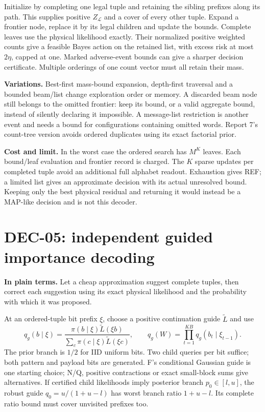 \documentclass[10pt,a4paper]{article}
\begin{document}
Initialize by completing one legal tuple and retaining the sibling prefixes along its path.
This supplies positive $Z_{\mathcal L}$ and a cover of every other tuple.
Expand a frontier node, replace it by its legal children and update the bounds. Complete leaves use
the physical likelihood exactly. Their normalized positive weighted counts give a feasible Bayes action
on the retained list, with excess risk at most $2\eta$, capped at one. Marked adverse-event bounds can
give a sharper decision certificate. Multiple orderings of one count vector must all retain their mass.

\textbf{Variations.} Best-first mass-bound expansion, depth-first traversal and a bounded beam/list
change exploration order or memory. A discarded beam node still belongs to the omitted frontier:
keep its bound, or a valid aggregate bound, instead of silently declaring it impossible.
A message-list restriction is another event and needs a bound for configurations containing omitted words.
Report 7's count-tree version avoids ordered duplicates using its exact factorial prior.

\textbf{Cost and limit.} In the worst case the ordered search has $M^K$ leaves.
Each bound/leaf evaluation and frontier record is charged. The $K$ sparse updates per completed tuple
avoid an additional full alphabet readout. Exhaustion gives REF; a limited list gives an approximate
decision with its actual unresolved bound. Keeping only the best physical residual and returning it
would instead be a MAP-like decision and is not this decoder.

\clearpage
\section{DEC-05: independent guided importance decoding}
\label{sec:importance}
\textbf{In plain terms.} Let a cheap approximation suggest complete tuples, then correct each suggestion
using its exact physical likelihood and the probability with which it was proposed.

At an ordered-tuple bit prefix $\xi$, choose a positive continuation guide $\widetilde L$ and use
\[
 q_g(b\mid\xi)=\frac{\pi(b\mid\xi)\widetilde L(\xi b)}
                    {\sum_c\pi(c\mid\xi)\widetilde L(\xi c)},\qquad
 q_g(W)=\prod_{t=1}^{KB}q_g(b_t\mid\xi_{t-1}).
\]
The prior branch is $1/2$ for IID uniform bits. Two child queries per bit suffice; both pattern and
payload bits are generated. F's conditional Gaussian guide is one starting choice; N/Q, positive
contractions or exact small-block sums give alternatives.
If certified child likelihoods imply posterior branch $p_0\in[l,u]$, the robust guide
$q_0=u/(1+u-l)$ has worst branch ratio $1+u-l$. Its complete ratio bound must cover unvisited prefixes too.
\end{document}

